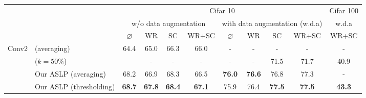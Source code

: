 \begin{table}[htbp]
  \centering
  \resizebox{14.0cm}{!} 
{
  \begin{tabular}{@{}llcccccccc|c@{}}
    \cline{3-11}
                       &                                                        & \multicolumn{8}{c|}{Cifar 10}                                                                                                 & Cifar 100 \\ 
                       \cline{3-11}
                            &                                                       & \multicolumn{4}{c}{w/o data augmentation}                                     & \multicolumn{4}{c|}{with data augmentation (w.d.a)}         &  w.d.a  \\
                            &                                                        & $\varnothing$ & WR             & SC            & WR+SC          & $\varnothing$ & WR             & SC            & WR+SC          &           WR+SC   \\ \midrule
    \multirow{4}{*}{Conv2} & \cite{DBLP:conf/nips/ZhouLLY19} (averaging)         &64.4          & 65.0          & 66.3          & 66.0          & -             & -             & -             & -            &               -        \\
                            & \cite{DBLP:conf/cvpr/RamanujanWKFR20}\footnotemark ($k=50\%$)  &               &   -           &         -     &         -     &       -       &      -        & 71.5   &       71.7       &     40.9         \\ 
                            & Our ASLP (averaging)                                     & 68.2          & 66.9          & 68.3          & 66.5          & \textbf{76.0} & \textbf{76.6} & 76.8          & 77.3          &       -         \\
                            & Our ASLP (thresholding)                                     & \textbf{68.7} & \textbf{67.8} & \textbf{68.4} & \textbf{67.1} & 75.9          & 76.4          & \textbf{77.5} & \textbf{77.5} &    \textbf{43.3}          \\
                            \midrule
  

\end{tabular}}
\end{table}

